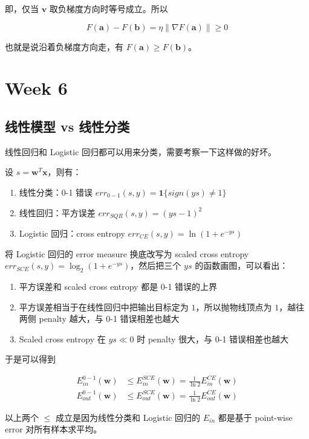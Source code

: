 \documentclass[a4paper]{article}
\begin{document}
即，仅当 $\mathbf{v}$ 取负梯度方向时等号成立。所以

$$F(\mathbf{a}) - F(\mathbf{b}) = \eta\|\nabla F(\mathbf{a})\| \ge 0$$

也就是说沿着负梯度方向走，有 $F(\mathbf{a}) \ge F(\mathbf{b})$。


\section{Week 6}
\subsection{线性模型 vs 线性分类}
线性回归和 Logistic 回归都可以用来分类，需要考察一下这样做的好坏。

设 $s = \mathbf{w}^T\mathbf{x}$，则有：
\begin{enumerate}
  \item 线性分类：0-1 错误 $err_{0-1}(s, y) = \mathbf{1}\{sign(ys) \neq 1\}$
  \item 线性回归：平方误差 $err_{SQR}(s, y) = (ys - 1)^2$
  \item Logistic 回归：cross entropy $err_{CE}(s, y) = \ln(1 + e^{-ys})$
\end{enumerate}

将 Logistic 回归的 error measure 换底改写为 scaled cross entropy $err_{SCE}(s, y) = \log_{2}(1 + e^{-ys})$，然后把三个 $ys$ 的函数画图，可以看出：

\begin{enumerate}
  \item 平方误差和 scaled cross entropy 都是 0-1 错误的上界
  \item 平方误差相当于在线性回归中把输出目标定为 $1$，所以抛物线顶点为 $1$，越往两侧 penalty 越大，与 0-1 错误相差也越大
  \item Scaled cross entropy 在 $ys \ll 0$ 时 penalty 很大，与 0-1 错误相差也越大
\end{enumerate}

于是可以得到

\begin{equation}
\begin{aligned}
E_{in}^{0-1}(\mathbf{w}) &\le E_{in}^{SCE}(\mathbf{w}) = \frac{1}{\ln2}E_{in}^{CE}(\mathbf{w}) \\
E_{out}^{0-1}(\mathbf{w}) &\le E_{out}^{SCE}(\mathbf{w}) = \frac{1}{\ln2}E_{out}^{CE}(\mathbf{w})
\end{aligned}
\end{equation}

以上两个 $\le$ 成立是因为线性分类和 Logistic 回归的 $E_{in}$ 都是基于 point-wise error 对所有样本求平均。
\end{document}
